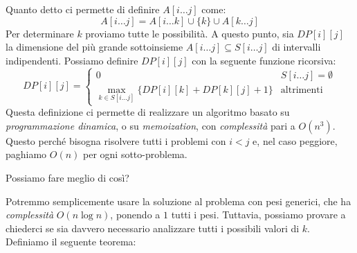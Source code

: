 \noindent
Quanto detto ci permette di definire $A[i\dots j]$ come:
\[A[i\dots j]=A[i\dots k]\cup\{k\}\cup A[k\dots j]\]
Per determinare $k$ proviamo tutte le possibilità. A questo punto, sia $DP[i][j]$
la dimensione del più grande sottoinsieme $A[i\dots j]\subseteq S[i\dots j]$ di
intervalli indipendenti. Possiamo definire $DP[i][j]$ con la seguente funzione
ricorsiva:
\[DP[i][j]=\begin{cases}
    0 & S[i\dots j]=\emptyset\\
    \max_{k\in S[i\dots j]}\{DP[i][k]+DP[k][j]+1\} & \text{altrimenti}
\end{cases}\]
Questa definizione ci permette di realizzare un algoritmo basato su
\emph{programmazione dinamica}, o su \emph{memoization}, con \emph{complessità}
pari a $O(n^3)$. Questo perché bisogna risolvere tutti i problemi con $i<j$ e,
nel caso peggiore, paghiamo $O(n)$ per ogni sotto-problema.

\bigskip\noindent
Possiamo fare meglio di così?

Potremmo semplicemente usare la soluzione al problema con pesi generici, che
ha \emph{complessità} $O(n\log n)$, ponendo a $1$ tutti i pesi. Tuttavia,
possiamo provare a chiederci se sia davvero necessario analizzare tutti i
possibili valori di $k$. Definiamo il seguente teorema:

